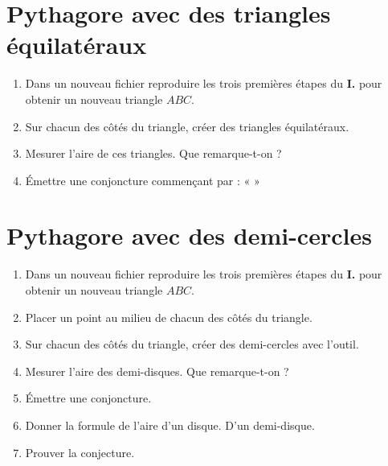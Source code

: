 \section{Pythagore avec des triangles équilatéraux}

\begin{enumerate}
    \item Dans un nouveau fichier \Geogebra \def\iconPath{geogebra/} reproduire les trois premières étapes du \textbf{\color{Red}I.} pour obtenir un nouveau triangle $ABC$.
    \item Sur chacun des côtés du triangle, créer des triangles équilatéraux.\\
    \item Mesurer l'aire de ces triangles. Que remarque-t-on ?\\
    \item Émettre une conjoncture commençant par :
    «
    »
\end{enumerate}

\section{Pythagore avec des demi-cercles}

\begin{enumerate}
    \item Dans un nouveau fichier \Geogebra \def\iconPath{geogebra/} reproduire les trois premières étapes du \textbf{\color{Red}I.} pour obtenir un nouveau triangle $ABC$.
    \item Placer un point au milieu de chacun des côtés du triangle.\\
    \item Sur chacun des côtés du triangle, créer des demi-cercles avec l'outil.\\
    \item Mesurer l'aire des demi-disques. Que remarque-t-on ?
    \item Émettre une conjoncture.
    \item Donner la formule de l'aire d'un disque. D'un demi-disque.
    \item Prouver la conjecture.\\
\end{enumerate}
